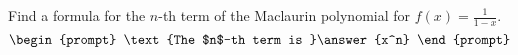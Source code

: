 \documentclass{ximera}
\author{Gregory Hartman \and Matthew Carr}
\begin{document}
\begin{exercise}





Find a formula for the $n$-th term of the Maclaurin polynomial for $f(x)=\frac{1}{1-x}$. 
\[
\begin{prompt}
\text{The $n$-th term is }\answer{x^n}
\end{prompt}
\]

\end{exercise}
\end{document}
